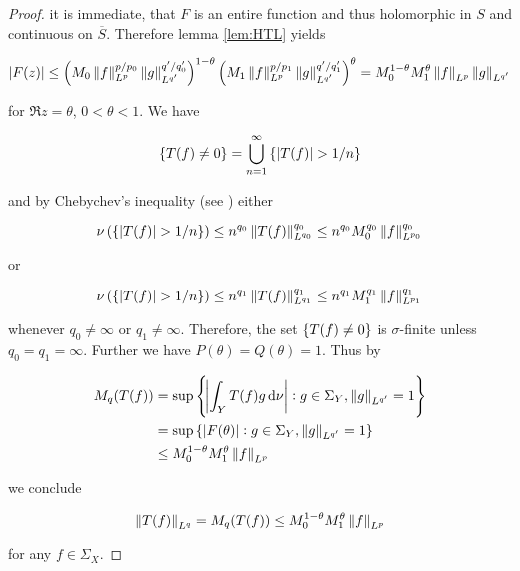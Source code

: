 \begin{proof}
\noindent it is immediate, that $F$ is an entire function and thus holomorphic in $S$ and continuous on $\overline{S}$. Therefore lemma \ref{lem:HTL} yields

\begin{gather*}
	\abs[0]{ F(z)} \leq \del{ M_0  \norm[0]{f}_{L^p}^{p/p_0} \norm[0]{g}_{L^{q'}}^{q'/q'_0}}^{1 - \theta}\del{ M_1 \norm[0]{f}_{L^p}^{p/p_1}\norm[0]{g}_{L^{q'}}^{q'/q_1'}}^\theta = M_0^{1 - \theta}M_1^\theta \norm[0]{f}_{L^p}\norm[0]{g}_{L^{q'}}
\end{gather*}

\noindent for $\Re z = \theta$, $0 < \theta < 1$. We have

\begin{equation*}
	\cbr[0]{ T(f) \neq 0} = \bigcup_{n = 1}^\infty \cbr[0]{ \abs[0]{ T(f)} > 1/n}
\end{equation*}

\noindent and by Chebychev's inequality (see \cite[193]{folland:real_analysis:1999}) either

\begin{equation*}
	\nu\del[0]{\cbr[0]{\abs[0]{ T(f)} > 1/n}} \leq n^{q_0}\norm[0]{ T(f)}_{L^{q_0}}^{q_0} \leq n^{q_0}M_0^{q_0}\norm[0]{ f}_{L^{p_0}}^{q_0}
\end{equation*}

\noindent or

\begin{equation*}
	\nu\del[0]{\cbr[0]{\abs[0]{ T(f)} > 1/n}} \leq n^{q_1}\norm[0]{ T(f)}_{L^{q_1}}^{q_1} \leq n^{q_1}M_1^{q_1}\norm[0]{ f}_{L^{p_1}}^{q_1}
\end{equation*}

\noindent whenever $q_0 \neq \infty$ or $q_1 \neq \infty$. Therefore, the set $\cbr[0]{ T(f) \neq 0}$ is $\sigma$-finite unless $q_0 = q_1 = \infty$. Further we have $P(\theta) = Q(\theta) = 1$. Thus by

\begin{gather*}
	\begin{aligned}
		M_q( T(f)) &= \sup\cbr{ \abs{\int_Y T(f)g\d\nu} : g \in \Sigma_Y, \norm[0]{g}_{L^{q'}} = 1}\\
		&=  \sup\cbr[0]{\abs[0]{ F(\theta)} : g \in \Sigma_Y, \norm[0]{g}_{L^{q'}} = 1}\\
		&\leq M_0^{1 - \theta}M_1^\theta \norm[0]{f}_{L^p}\\
	\end{aligned}
\end{gather*}

\noindent we conclude 
	
\begin{equation*}
	\norm[0]{ T(f)}_{L^q} = M_q( T(f)) \leq M_0^{1 - \theta}M_1^\theta \norm[0]{f}_{L^p}
\end{equation*}
	
\noindent for any $f \in \Sigma_X$.
\end{proof}

